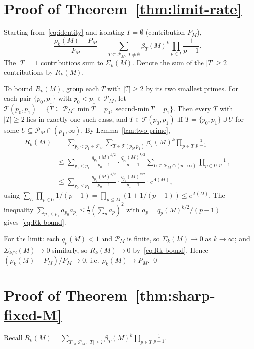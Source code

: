 \documentclass[11pt]{article}
\theoremstyle{remark}
\newcommand{\PM}{\mathcal{P}_M}
\begin{document}
\section{Proof of Theorem~\ref{thm:limit-rate}}\label{sec:thm2}

Starting from~\eqref{eq:identity} and isolating $T = \emptyset$ (contribution $P_M$),
\[
\frac{\rho_k(M) - P_M}{P_M} = \sum_{T \subseteq \PM,\; T \neq \emptyset} \beta_T(M)^k \prod_{p \in T} \frac{1}{p-1}.
\]
The $|T| = 1$ contributions sum to $\Sigma_k(M)$. Denote the sum of the $|T| \geq 2$ contributions by $R_k(M)$.

To bound $R_k(M)$, group each $T$ with $|T| \geq 2$ by its two smallest primes. For each pair $\{p_0, p_1\}$ with $p_0 < p_1 \in \PM$, let $\mathcal{T}(p_0, p_1) = \{T \subseteq \PM : \min T = p_0,\; \text{second-min}\, T = p_1\}$. Then every $T$ with $|T| \geq 2$ lies in exactly one such class, and $T \in \mathcal{T}(p_0, p_1)$ iff $T = \{p_0, p_1\} \cup U$ for some $U \subseteq \PM \cap (p_1, \infty)$. By Lemma~\ref{lem:two-prime},
\begin{align*}
R_k(M) &= \sum_{p_0 < p_1 \in \PM} \sum_{T \in \mathcal{T}(p_0, p_1)} \beta_T(M)^k \prod_{p \in T} \frac{1}{p-1} \\
&\leq \sum_{p_0 < p_1} \frac{q_{p_0}(M)^{k/2}}{p_0 - 1}\cdot \frac{q_{p_1}(M)^{k/2}}{p_1 - 1} \sum_{U \subseteq \PM \cap (p_1, \infty)} \prod_{p \in U} \frac{1}{p-1} \\
&\leq \sum_{p_0 < p_1} \frac{q_{p_0}(M)^{k/2}}{p_0 - 1}\cdot \frac{q_{p_1}(M)^{k/2}}{p_1 - 1} \cdot e^{\Lambda(M)},
\end{align*}
using $\sum_U \prod_{p \in U} 1/(p-1) = \prod_{p \leq M}(1 + 1/(p-1)) \leq e^{\Lambda(M)}$. The inequality $\sum_{p_0 < p_1} a_{p_0} a_{p_1} \leq \tfrac12(\sum_p a_p)^2$ with $a_p = q_p(M)^{k/2}/(p-1)$ gives~\eqref{eq:Rk-bound}.

For the limit: each $q_p(M) < 1$ and $\PM$ is finite, so $\Sigma_k(M) \to 0$ as $k \to \infty$; and $\Sigma_{k/2}(M) \to 0$ similarly, so $R_k(M) \to 0$ by~\eqref{eq:Rk-bound}. Hence $(\rho_k(M) - P_M)/P_M \to 0$, i.e.\ $\rho_k(M) \to P_M$. \qed

\section{Proof of Theorem~\ref{thm:sharp-fixed-M}}\label{sec:thm-sharp-fixed-M}

Recall $R_k(M) = \sum_{T \subseteq \PM,\, |T| \geq 2}\beta_T(M)^k \prod_{p \in T}\frac{1}{p-1}$.
\end{document}
